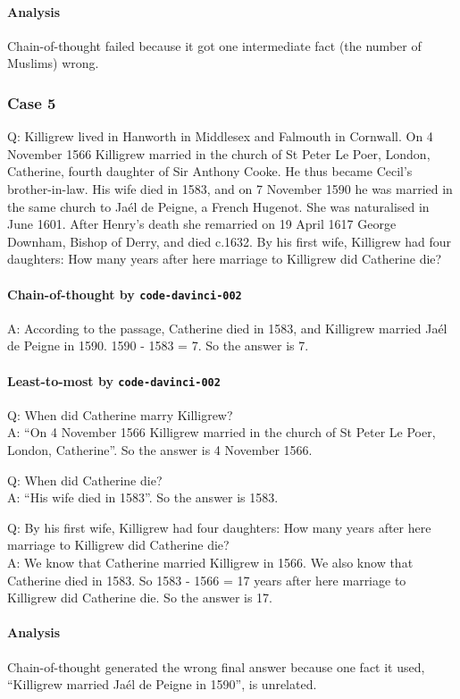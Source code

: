 \paragraph{Analysis}
Chain-of-thought failed because it got one intermediate fact (the number of Muslims) wrong.

\subsubsection{Case 5}
Q: Killigrew lived in Hanworth in Middlesex and Falmouth in Cornwall. On 4 November 1566 Killigrew married in the church of St Peter Le Poer, London, Catherine, fourth daughter of Sir Anthony Cooke. He thus became Cecil's brother-in-law. His wife died in 1583, and on 7 November 1590 he was married in the same church to Jaél de Peigne, a French Hugenot. She was naturalised in June 1601. After Henry's death she remarried on 19 April 1617 George Downham, Bishop of Derry, and died c.1632. By his first wife, Killigrew had four daughters: How many years after here marriage to Killigrew did Catherine die?

\paragraph{Chain-of-thought by \texttt{code-davinci-002}}
A: According to the passage, Catherine died in 1583, and Killigrew married Jaél de Peigne in 1590. 1590 - 1583 = 7. So the answer is 7.

\paragraph{Least-to-most by \texttt{code-davinci-002}}
Q: When did Catherine marry Killigrew?\\
A: ``On 4 November 1566 Killigrew married in the church of St Peter Le Poer, London, Catherine''. So the answer is 4 November 1566.

Q: When did Catherine die?\\
A: ``His wife died in 1583''. So the answer is 1583.

Q: By his first wife, Killigrew had four daughters: How many years after here marriage to Killigrew did Catherine die?\\
A: We know that Catherine married Killigrew in 1566. We also know that Catherine died in 1583. So 1583 - 1566 = 17 years after here marriage to Killigrew did Catherine die. So the answer is 17.

\paragraph{Analysis}
Chain-of-thought generated the wrong final answer because one fact it used, ``Killigrew married Jaél de Peigne in 1590'', is unrelated.
